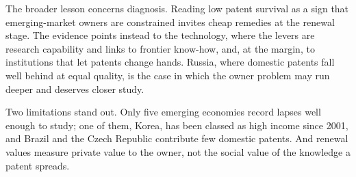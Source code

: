 The broader lesson concerns diagnosis. Reading low patent survival as a sign that emerging-market owners are
constrained invites cheap remedies at the renewal stage. The evidence points instead to the technology, where the
levers are research capability and links to frontier know-how, and, at the margin, to institutions that let patents
change hands. Russia, where domestic patents fall well behind at equal quality, is the case in which the owner
problem may run deeper and deserves closer study.

Two limitations stand out. Only five emerging economies record lapses well enough to study; one of them, Korea, has been classed as high income since 2001, and Brazil and the Czech Republic contribute few domestic patents. And renewal values measure private value to the owner, not the social value of the
knowledge a patent spreads.

